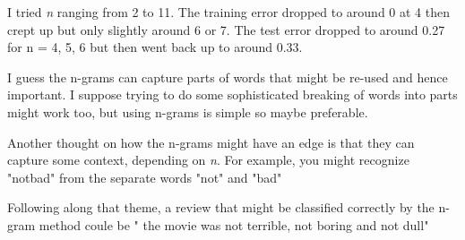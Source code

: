 \begin{answer}
  I tried \emph{n} ranging from 2 to 11.  The training error dropped to around 0 at 4 then crept up but only slightly around 6 or 7.  The test error dropped to around 0.27 for n = 4, 5, 6 but then went back up to around 0.33.
  
I guess the n-grams can capture parts of words that might be re-used and hence important.  I suppose trying to do some sophisticated breaking of words into parts might work too, but using n-grams is simple so maybe preferable.

Another thought on how the n-grams might have an edge is that they can capture some context, depending on \emph{n}. For example, you might recognize "notbad" from the separate words "not" and "bad"

Following along that theme, a review that might be classified correctly by the n-gram method coule be
  " the movie was not terrible, not boring and not dull"

\end{answer}
\clearpage




